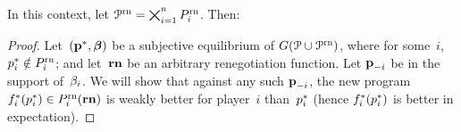 \documentclass[sigconf]{aamas}
\newcommand{\allprogrn}{\allprog^{\text{rn}}}
\theoremstyle{definition}
\begin{document}
In this context, let $\allprogrn = \bigtimes_{i=1}^{{n}} \onefsspacei$. Then:

\spirational*

\begin{proof}
Let~$(\textbf{p}^*, \boldsymbol{\beta})$
be a subjective equilibrium
of $\game(\allprog \cup \allprogrn)$,
where for some~$i$,
$p_i^* \notin P_i^{\textnormal{rn}}$;
and
let~$\mathbf{rn}$
be an arbitrary
renegotiation function.
Let $\textbf{p}_{-i}$ be in the support of~$\beta_i$.
We will
show
that
against any such $\textbf{p}_{-i}$,
the
new program $f_i^*(p_i^*) \in P_i^{\textnormal{rn}}(\mathbf{rn})$
is
weakly
better for player~$i$
than~$p_i^*$
(hence $f_i^*(p_i^*)$ is better in expectation).


\end{proof}
\end{document}
